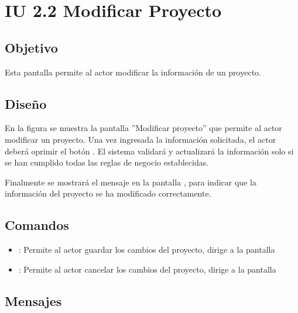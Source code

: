 \section{IU 2.2 Modificar Proyecto}

\subsection{Objetivo}
	Esta pantalla permite al actor modificar la información de un proyecto.
\subsection{Diseño}
	En la figura  se muestra la pantalla ''Modificar proyecto'' que permite al actor modificar un proyecto.
	Una vez ingresada la información solicitada, el actor deberá oprimir el botón  . El sistema validará y actualizará la información solo si se han cumplido todas las reglas de negocio establecidas.
	
	Finalmente se mostrará el mensaje  en la pantalla , para indicar que la información del proyecto se ha modificado correctamente.

\subsection{Comandos}
\begin{itemize}
	\item {}: Permite al actor guardar los cambios del proyecto, dirige a la pantalla 
	\item {}: Permite al actor cancelar los cambios del proyecto, dirige a la pantalla 
\end{itemize}

\subsection{Mensajes}

